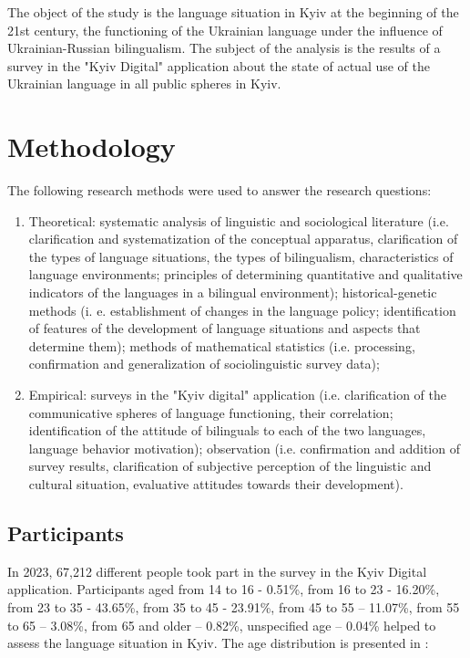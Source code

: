 \documentclass[english]{textolivre}
\begin{document}
The object of the study is the language situation in Kyiv at the beginning of the 21st century, the functioning of the Ukrainian language under the influence of Ukrainian-Russian bilingualism. The subject of the analysis is the results of a survey in the "Kyiv Digital" application about the state of actual use of the Ukrainian language in all public spheres in Kyiv.


\section{Methodology}
The following research methods were used to answer the research questions:

\begin{enumerate}
 \item Theoretical: systematic analysis of linguistic and sociological literature (i.e. clarification and systematization of the conceptual apparatus, clarification of the types of language situations, the types of bilingualism, characteristics of language environments; principles of determining quantitative and qualitative indicators of the languages in a bilingual environment); historical-genetic methods (i. e. establishment of changes in the language policy; identification of features of the development of language situations and aspects that determine them); methods of mathematical statistics (i.e. processing, confirmation and generalization of sociolinguistic survey data);
 \item Empirical: surveys in the "Kyiv digital" application (i.e. clarification of the communicative spheres of language functioning, their correlation; identification of the attitude of bilinguals to each of the two languages, language behavior motivation); observation (i.e. confirmation and addition of survey results, clarification of subjective perception of the linguistic and cultural situation, evaluative attitudes towards their development).
\end{enumerate}


\subsection{Participants}

In 2023, 67,212 different people took part in the survey in the Kyiv Digital application. Participants aged from 14 to 16 - 0.51\%, from 16 to 23 - 16.20\%, from 23 to 35 - 43.65\%, from 35 to 45 - 23.91\%, from 45 to 55 – 11.07\%, from 55 to 65 – 3.08\%, from 65 and older – 0.82\%, unspecified age – 0.04\% helped to assess the language situation in Kyiv. The age distribution is presented in : 
\end{document}
